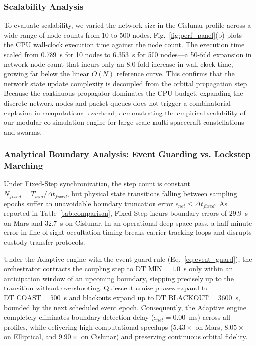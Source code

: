 \documentclass[a4paper,fleqn]{cas-sc}
\begin{document}
\subsubsection{Scalability Analysis}
To evaluate scalability, we varied the network size in the Cislunar profile across a wide range of node counts from 10 to 500 nodes. Fig.~\ref{fig:perf_panel}(b) plots the CPU wall-clock execution time against the node count. The execution time scaled from 0.789~s for 10 nodes to 6.353~s for 500 nodes---a 50-fold expansion in network node count that incurs only an 8.0-fold increase in wall-clock time, growing far below the linear $O(N)$ reference curve. This confirms that the network state update complexity is decoupled from the orbital propagation step. Because the continuous propagator dominates the CPU budget, expanding the discrete network nodes and packet queues does not trigger a combinatorial explosion in computational overhead, demonstrating the empirical scalability of our modular co-simulation engine for large-scale multi-spacecraft constellations and swarms.

\subsubsection{Analytical Boundary Analysis: Event Guarding vs. Lockstep Marching}
Under Fixed-Step synchronization, the step count is constant $N_{fixed} = T_{sim} / \Delta t_{fixed}$, but physical state transitions falling between sampling epochs suffer an unavoidable boundary truncation error $\epsilon_{net} \le \Delta t_{fixed}$. As reported in Table~\ref{tab:comparison}, Fixed-Step incurs boundary errors of $29.9$~s on Mars and $32.7$~s on Cislunar. In an operational deep-space pass, a half-minute error in line-of-sight occultation timing breaks carrier tracking loops and disrupts custody transfer protocols.

Under the Adaptive engine with the event-guard rule (Eq.~\eqref{eq:event_guard}), the orchestrator contracts the coupling step to $\text{DT\_MIN} = 1.0$~s only within an anticipation window of an upcoming boundary, stepping precisely up to the transition without overshooting. Quiescent cruise phases expand to $\text{DT\_COAST} = 600$~s and blackouts expand up to $\text{DT\_BLACKOUT} = 3600$~s, bounded by the next scheduled event epoch. Consequently, the Adaptive engine completely eliminates boundary detection delay ($\epsilon_{net} = 0.00$~ms) across all profiles, while delivering high computational speedups ($5.43\times$ on Mars, $8.05\times$ on Elliptical, and $9.90\times$ on Cislunar) and preserving continuous orbital fidelity.
\end{document}
